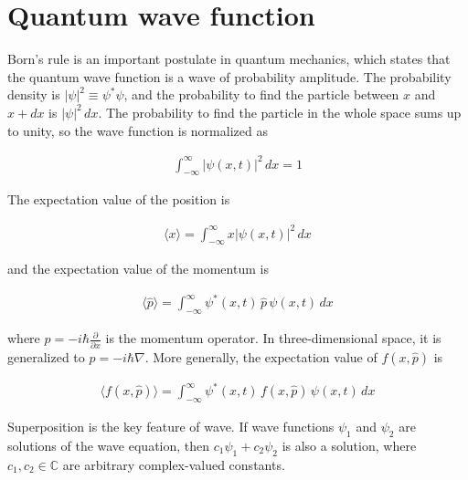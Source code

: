 \documentclass[12pt]{book} %
\numberwithin{equation}{chapter}
\def\C{\mathbb{C}}
\def\p{\partial}
\def\n{\nabla}
\begin{document}
\section{Quantum wave function}
Born's rule is an important postulate in quantum mechanics, which states that the quantum wave function is a wave of probability amplitude. The probability density is ${\left|\psi\right|}^{2}\equiv \psi^\ast \psi$, and the probability to find the particle between $x$ and $x+dx$ is ${\left|\psi\right|}^{2}\,dx$.\bigskip\newline
The probability to find the particle in the whole space sums up to unity, so the wave function is normalized as
\begin{eqnbox}
\begin{align}
\int_{-\infty}^{\infty} {\left|\psi(x,t)\right|}^{2}\,dx=1
\end{align}
\end{eqnbox}
The expectation value of the position is
\begin{eqnbox}
\begin{align}
\langle x\rangle=\int_{-\infty}^{\infty} x{\left|\psi(x,t)\right|}^{2}\,dx
\end{align}
\end{eqnbox}
and the expectation value of the momentum is
\begin{eqnbox}
\begin{align}
\langle \hat{p}\rangle=\int_{-\infty}^{\infty} \psi^\ast(x,t)\,\hat{p}\,\psi(x, t)\,dx
\end{align}
\end{eqnbox}
where $\hat{p}=-i\hbar\frac{\p}{\p x}$ is the momentum operator. In three-dimensional space, it is generalized to $\hat{p}=-i\hbar\n$.\bigskip\newline
More generally, the expectation value of $f(x, \hat{p})$ is
\begin{eqnbox}
\begin{align}
\langle f(x, \hat{p})\rangle=\int_{-\infty}^{\infty} \psi^\ast(x,t)\,f(x, \hat{p})\,\psi(x, t)\,dx
\end{align}
\end{eqnbox}
Superposition is the key feature of wave. If wave functions $\psi_{1}$ and $\psi_{2}$ are solutions of the wave equation, then $c_{1}\psi_{1}+c_{2}\psi_{2}$ is also a solution, where $c_{1}, c_{2}\in\C$ are arbitrary complex-valued constants.
\end{document}
